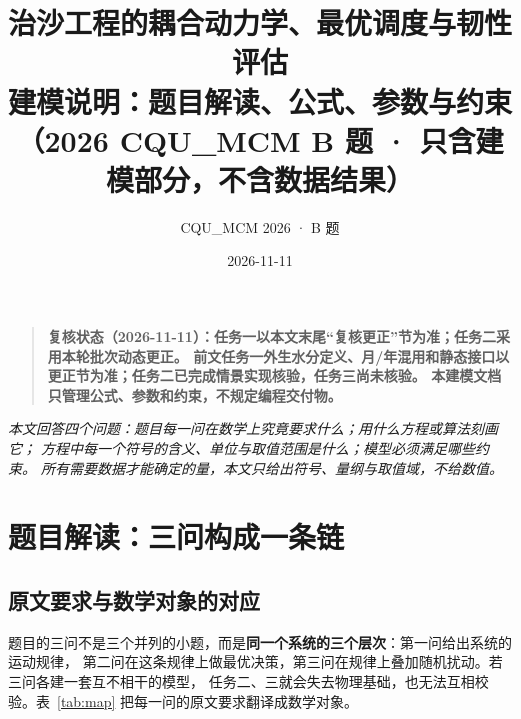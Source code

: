 \documentclass[11pt,a4paper]{ctexart}
\title{\bfseries 治沙工程的耦合动力学、最优调度与韧性评估\\[6pt]
\large 建模说明：题目解读、公式、参数与约束\\[2pt]
\normalsize （2026 CQU\_MCM B 题 · 只含建模部分，不含数据结果）}
\author{CQU\_MCM 2026 · B 题}
\date{2026-11-11}
\begin{document}
\maketitle
\begin{quote}\small\bfseries
复核状态（2026-11-11）：任务一以本文末尾“复核更正”节为准；任务二采用本轮批次动态更正。
前文任务一外生水分定义、月/年混用和静态接口以更正节为准；任务二已完成情景实现核验，任务三尚未核验。
本建模文档只管理公式、参数和约束，不规定编程交付物。
\end{quote}

\thispagestyle{empty}

\begin{center}
\begin{minipage}{0.88\textwidth}
\small\itshape
本文回答四个问题：题目每一问在数学上究竟要求什么；用什么方程或算法刻画它；
方程中每一个符号的含义、单位与取值范围是什么；模型必须满足哪些约束。
所有需要数据才能确定的量，本文只给出符号、量纲与取值域，不给数值。
\end{minipage}
\end{center}

\vspace{0.6em}
\tableofcontents
\newpage

\section{题目解读：三问构成一条链}

\subsection{原文要求与数学对象的对应}

题目的三问不是三个并列的小题，而是\textbf{同一个系统的三个层次}：第一问给出系统的运动规律，
第二问在这条规律上做最优决策，第三问在规律上叠加随机扰动。若三问各建一套互不相干的模型，
任务二、三就会失去物理基础，也无法互相校验。表~\ref{tab:map} 把每一问的原文要求翻译成数学对象。
\end{document}
